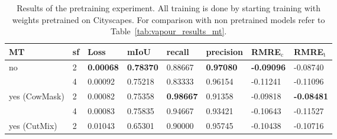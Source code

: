 \begin{table}[htbp]
    \centering
    \begin{tabular}{llllllll}
        \toprule
        MT            & sf & Loss             & mIoU             & recall           & precision        & RMRE$_\text{c}$   & RMRE$_\text{t}$   \\ \midrule
no            & 2  & \textbf{0.00068} & \textbf{0.78370} & 0.88667          & \textbf{0.97080} & \textbf{-0.09096} & -0.08740          \\
              & 4  & 0.00092          & 0.75218          & 0.83333          & 0.96154          & -0.11241          & -0.11096          \\ \midrule
yes (CowMask) & 2  & 0.00082          & 0.75358          & \textbf{0.98667} & 0.91358          & -0.09818          & \textbf{-0.08481} \\
              & 4  & 0.00083          & 0.75835          & 0.94667          & 0.93421          & -0.10643          & -0.11527          \\ \midrule
yes (CutMix)  & 2  & 0.01043          & 0.65301          & 0.90000          & 0.95745          & -0.10438          & -0.10716          \\
        \bottomrule
        \end{tabular}
    \vspace{0.2cm}
    \caption{Results of the pretraining experiment. All training is done by starting training with weights pretrained on Cityscapes. For comparison with non pretrained models refer to Table~\ref{tab:vapour_results_mt}.}
    \label{tab:pretraining}
\end{table}
